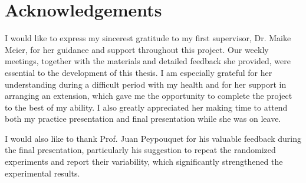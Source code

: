 \documentclass[11pt,a4paper]{report}
\theoremstyle{definition}
\theoremstyle{plain}
\begin{document}
\clearpage

\chapter*{Acknowledgements}

I would like to express my sincerest gratitude to my first supervisor, Dr. Maike Meier, for her guidance and support throughout this project. Our weekly meetings, together with the materials and detailed feedback she provided, were essential to the development of this thesis. I am especially grateful for her understanding during a difficult period with my health and for her support in arranging an extension, which gave me the opportunity to complete the project to the best of my ability. I also greatly appreciated her making time to attend both my practice presentation and final presentation while she was on leave.

I would also like to thank Prof. Juan Peypouquet for his valuable feedback during the final presentation, particularly his suggestion to repeat the randomized experiments and report their variability, which significantly strengthened the experimental results.

\clearpage


\tableofcontents

\clearpage









\clearpage



\end{document}
